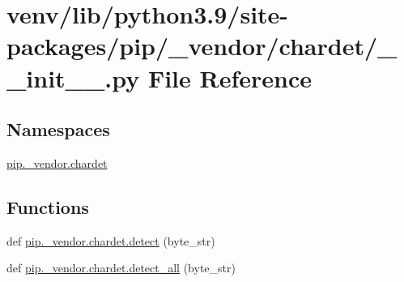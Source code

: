 \hypertarget{venv_2lib_2python3_89_2site-packages_2pip_2__vendor_2chardet_2____init_____8py}{}\section{venv/lib/python3.9/site-\/packages/pip/\+\_\+vendor/chardet/\+\_\+\+\_\+init\+\_\+\+\_\+.py File Reference}
\label{venv_2lib_2python3_89_2site-packages_2pip_2__vendor_2chardet_2____init_____8py}
\subsection*{Namespaces}
\begin{DoxyCompactItemize}
\item 
 \hyperlink{namespacepip_1_1__vendor_1_1chardet}{pip.\+\_\+vendor.\+chardet}
\end{DoxyCompactItemize}
\subsection*{Functions}
\begin{DoxyCompactItemize}
\item 
def \hyperlink{namespacepip_1_1__vendor_1_1chardet_ab15e4707617933abec1db357bf0ab9a3}{pip.\+\_\+vendor.\+chardet.\+detect} (byte\+\_\+str)
\item 
def \hyperlink{namespacepip_1_1__vendor_1_1chardet_acc1ed5d3dc7540cefb5c3831521310e6}{pip.\+\_\+vendor.\+chardet.\+detect\+\_\+all} (byte\+\_\+str)
\end{DoxyCompactItemize}
